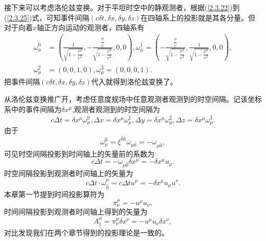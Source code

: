 \documentclass[11pt, a4paper, oneside, onecolumn]{ctexart}
\numberwithin{equation}{subsection}
\begin{document}
接下来可以考虑洛伦兹变换。对于平坦时空中的静观测者，根据(\ref{2.3.22})到(\ref{2.3.25})式，可知事件间隔$\left(c\delta{}t,\delta{}x,\delta{}y,\delta{}z\right)$在四轴系上的投影就是其各分量。但对于向着$x$轴正方向运动的观测者，四轴系有
\begin{align}
\omega^{\hat{0}}_{\mu}&=\left(\frac{1}{\sqrt{1-\dfrac{v^{2}}{c^{2}}}},-\frac{\dfrac{v}{c}}{\sqrt{1-\dfrac{v^{2}}{c^{2}}}},0,0\right),\omega^{\hat{1}}_{\mu}=\left(-\frac{\dfrac{v}{c}}{\sqrt{1-\dfrac{v^{2}}{c^{2}}}},\frac{1}{\sqrt{1-\dfrac{v^{2}}{c^{2}}}},0,0\right),\\
\omega^{\hat{2}}_{\mu}&=\left(0,0,1,0\right),\omega^{\hat{3}}_{\mu}=\left(0,0,0,1\right).
\end{align}
把事件间隔$\left(c\delta{}t,\delta{}x,\delta{}y,\delta{}z\right)$代入就得到洛伦兹变换了。

从洛伦兹变换推广开，考虑任意度规场中任意观测者观测到的时空间隔。记该坐标系中的事件间隔为$\delta{}x^{\mu}$,观测者观测到的时空间隔为
\begin{equation}
c\Delta{}t=\delta{}x^{\mu}\omega_{\mu}^{\hat{0}},\Delta{}x=\delta{}x^{\mu}\omega_{\mu}^{\hat{1}},\Delta{}y=\delta{}x^{\mu}\omega_{\mu}^{\hat{2}},\Delta{}z=\delta{}x^{\mu}\omega_{\mu}^{\hat{3}}.
\end{equation}
由于
\begin{equation}
\omega_{\mu}^{\hat{0}}=\xi^{\hat{0}\hat{a}}\omega_{\mu\hat{a}}=-\omega_{\mu\hat{0}},
\end{equation}
可见时空间隔投影到时间轴上的矢量前的系数为
\begin{equation}
c\Delta{}t=-\omega_{\mu\hat{0}}\delta{}x^{\mu}=-\delta{}x^{\mu}u_{\mu}.
\end{equation}
时空间隔投影到观测者时间轴上的矢量为
\begin{equation}
c\Delta{}t\cdot\omega^{\mu}_{\hat{0}}=c\Delta{}tu^{\mu}=-\delta{}x^{\mu}u_{\mu}u^{\nu}.
\end{equation}
本章第一节提到时间投影算符为
\begin{equation}
\pi^{\mu}_{\nu}=-u^{\mu}u_{\nu},
\end{equation}
时间间隔投影到观测者时间轴上得到的矢量为
\begin{equation}
A^{\mu}_{\parallel}=\pi^{\mu}_{\nu}\delta{}x^{\nu}=-u^{\mu}u_{\nu}\delta{}x^{\nu},
\end{equation}
对比发现我们在两个章节得到的投影理论是一致的。
\end{document}
